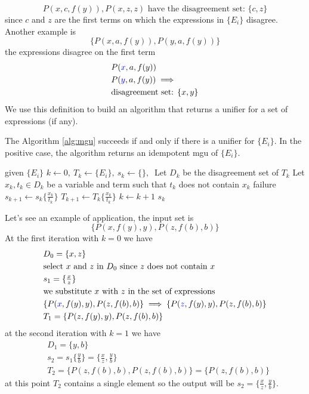 \documentclass[10pt, letterpaper]{report}
\begin{document}
\[ P(x,c,f(y)), P(x,z,z) \text{ have the disagreement set: }\{c,z\}\]
since $c$ and $z$ are the first terms on which the expressions in $\{E_i\}$ disagree. Another example is 
\[\{P(x,a,f(y)),P(y,a,f(y))\}\]
the expressions disagree on the first term\begin{align*}
    &P(\color{blue}x\color{black},a,f(y))\\
    &P(\color{blue}y\color{black},a,f(y))\implies\\
    &\text{disagreement set: }\{x,y\}
\end{align*}
We use this definition to build an algorithm that returns a unifier for a set of expressions (if any).
\begin{theorem}
    The Algorithm \ref{alg:mgu} succeeds if and only if there is a unifier for $\{E_i\}$. In the positive case, the algorithm returns an idempotent mgu of $\{E_i\}$.
\end{theorem}
\begin{algorithm}
\caption{Find-MGU}\label{alg:mgu}
\begin{algorithmic}[1]
\State given $\{E_i\}$
\State $k\leftarrow 0, \ T_k\leftarrow \{E_i\}, \ s_k\leftarrow \{\}, \ $
\State Let $D_k$ be the disagreement set of $T_k$
\State {}
\State Let $x_k,t_k\in D_k$ be a variable and term such that $t_k$ does not contain $x_k$
\State\Return failure
\EndIf
\State $s_{k+1}\leftarrow s_k\{\tfrac{x_k}{t_k}\}$ 
\State $T_{k+1}\leftarrow T_k\{\tfrac{x_k}{t_k}\}$ 
\State $k\leftarrow k+1$
\EndWhile 
\State\Return $s_k$
\end{algorithmic}
\end{algorithm}
Let's see an example of application, the input set is\[\{P(x,f(y),y),P(z,f(b),b)\}\]
At the first iteration with $k=0$ we have \begin{align*}
    &D_0=\{x,z\}\\ 
    &\text{select $x$ and $z$ in $D_0$ since $z$ does not contain $x$}\\
    &s_1=\{\tfrac{x}{z}\}\\ 
    &\text{we substitute $x$ with $z$ in the set of expressions}\\ 
    &\{P(\color{blue}x\color{black},f(y),y),P(z,f(b),b)\}\implies \{P(\color{blue}z\color{black},f(y),y),P(z,f(b),b)\}\\ 
    &T_1=\{P(z,f(y),y),P(z,f(b),b)\}
\end{align*}
at the second iteration with $k=1$ we have \begin{align*}
    &D_1=\{y,b\}\\
    &s_2=s_1\{\tfrac{y}{b}\}=\{\tfrac{x}{z},\tfrac{y}{b}\}\\
    &T_2=\{P(z,f(b),b),P(z,f(b),b)\}=\{P(z,f(b),b)\}
\end{align*}
at this point $T_2$ contains a single element so the output will be $s_2=\{\tfrac{x}{z},\tfrac{y}{b}\}$.\bigskip 
\end{document}
